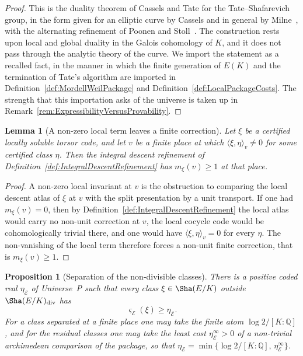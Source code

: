 \documentclass[10pt, reqno]{amsart}
\theoremstyle{plain}
\newtheorem{proposition}[theorem]{Proposition}
\newtheorem{lemma}[theorem]{Lemma}
\theoremstyle{definition}
\theoremstyle{plain}
\newcommand{\Q}{\mathbb{Q}}
\begin{document}
\begin{proof}
This is the duality theorem of Cassels and Tate for the Tate--Shafarevich group, in the form given for an elliptic curve by Cassels and in general by Milne~\cite{Cassels1965, Tate1963, MilneADT}, with the alternating refinement of Poonen and Stoll~\cite{PoonenStoll1999}. The construction rests upon local and global duality in the Galois cohomology of $K$, and it does not pass through the analytic theory of the curve. We import the statement as a recalled fact, in the manner in which the finite generation of $E(K)$ and the termination of Tate's algorithm are imported in Definition~\ref{def:MordellWeilPackage} and Definition~\ref{def:LocalPackageCosts}. The strength that this importation asks of the universe is taken up in Remark~\ref{rem:ExpressibilityVersusProvability}.
\end{proof}

\begin{lemma}[A non-zero local term leaves a finite correction]
\label{lem:NonzeroLocalTermForcesCorrection}
Let $\xi$ be a certified locally soluble torsor code, and let $v$ be a finite place at which $\langle\xi,\eta\rangle_{v}\neq 0$ for some certified class $\eta$. Then the integral descent refinement of Definition~\ref{def:IntegralDescentRefinement} has $m_{\xi}(v)\ge 1$ at that place.
\end{lemma}

\begin{proof}
A non-zero local invariant at $v$ is the obstruction to comparing the local descent atlas of $\xi$ at $v$ with the split presentation by a unit transport. If one had $m_{\xi}(v)=0$, then by Definition~\ref{def:IntegralDescentRefinement} the local atlas would carry no non-unit correction at $v$, the local cocycle code would be cohomologically trivial there, and one would have $\langle\xi,\eta\rangle_{v}=0$ for every $\eta$. The non-vanishing of the local term therefore forces a non-unit finite correction, that is $m_{\xi}(v)\ge 1$.
\end{proof}

\begin{proposition}[Separation of the non-divisible classes]
\label{prop:SeparationFromCasselsTate}
There is a positive coded real $\eta_{\mathcal{E}}$ of Universe~P such that every class $\xi\in\Sha(E/K)$ outside $\Sha(E/K)_{\mathrm{div}}$ has
\[
  \varsigma_{\mathcal{E}}(\xi)
  \ge
  \eta_{\mathcal{E}}.
\]
For a class separated at a finite place one may take the finite atom $\log 2/[K:\Q]$, and for the residual classes one may take the least cost $\eta^{\infty}_{\mathcal{E}}>0$ of a non-trivial archimedean comparison of the package, so that $\eta_{\mathcal{E}}=\min\{\log 2/[K:\Q],\,\eta^{\infty}_{\mathcal{E}}\}$.
\end{proposition}
\end{document}
